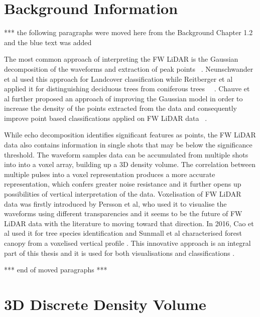 \documentclass{subfiles}
\begin{document}
\section{Background Information}
		\par {\color{red} *** the following paragraphs were moved here from the Background Chapter 1.2 and the blue text was added}
		
		\par The most common approach of interpreting the FW LiDAR is the Gaussian decomposition of the waveforms and extraction of peak points ~\cite{Wanger2006}. Neunschwander et al used this approach for Landcover classification while Reitberger et al applied it for distinguishing deciduous trees from coniferous trees ~\cite{Neuenschwander2009}~\cite{Reitberger2008}. Chauve et al further proposed an approach of improving the Gaussian model in order to increase the density of the points extracted from the data and consequently improve point based classifications applied on FW LiDAR data ~\cite{Chauve2007}. 
		
		\par While echo decomposition identifies significant features as points, the FW LiDAR data also contains information in single shots that may be below the significance threshold. The waveform samples data can be accumulated from multiple shots into {\color{blue} into a voxel array, building up a 3D density volume. The correlation between multiple pulses into a voxel representation produces a more accurate representation, which confers greater noise resistance and it further opens up possibilities of vertical interpretation of the data.} Voxelisation {\color{blue} of FW LiDAR data} was firstly introduced by Persson et al, who used it to visualise the waveforms using different transparencies \cite{Persson2005} and it seems to be the future of FW LiDAR data with the literature to moving toward that direction. In 2016, Cao et al used it for tree species identification \cite{Cao2016} and Sunmall et al characterised forest canopy from a voxelised vertical profile \cite{Sumnall2016}. This innovative approach is an integral part of this thesis and it is used for both visualisations and classifications \cite{Miltiadou2014}\cite{Miltiadou2015}. 
		\par {\color{red} *** end of moved paragraphs *** }
		

	
\section{3D Discrete Density Volume}
\end{document}
